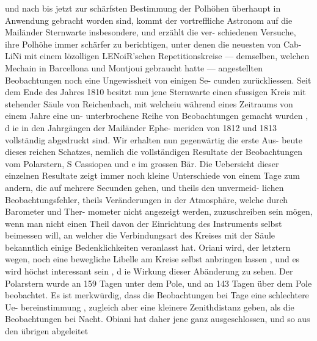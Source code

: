 \documentclass[12pt,a4paper]{article}
\begin{document}
und nach bis jetzt zur schärfsten Bestimmung der Polhöhen überhaupt in Anwendung gebracht worden\newline
sind, kommt der vortreffliche Astronom auf die Mailänder Sternwarte insbesondere, und erzählt die ver-\newline
schiedenen Versuche, ihre Polhöhe immer schärfer zu berichtigen, unter denen die neuesten von Cab-\newline
LiNi mit einem lözolligen LENoiR'schen Repetitionskreise --- demselben, welchen Mechain in Barcellona\newline
und Montjoui gebraucht hatte --- angestellten Beobachtungen noch eine Ungewissheit von einigen Se-\newline
cunden zurückliessen. Seit dem Ende des Jahres 1810 besitzt nun jene Sternwarte einen sfussigen Kreis\newline
mit stehender Säule von Reichenbach, mit welcheiu während eines Zeitraums von einem Jahre eine un-\newline
unterbrochene Reihe von Beobachtungen gemacht wurden , d ie in den Jahrgängen der Mailänder Ephe-\newline
meriden von 1812 und 1813 vollständig abgedruckt sind. Wir erhalten nun gegenwärtig die erste Aus-\newline
beute dieses reichen Schatzes, nemlich die vollständigen Resultate der Beobachtungen vom Polarstern,\newline
S Cassiopea und e im grossen Bär. Die Uebersicht dieser einzelnen Resultate zeigt immer noch kleine\newline
Unterschiede von einem Tage zum andern, die auf mehrere Secunden gehen, und theils den unvermeid-\newline
lichen Beobachtungsfehler, theils Veränderungen in der Atmosphäre, welche durch Barometer und Ther-\newline
mometer nicht angezeigt werden, zuzuschreiben sein mögen, wenn man nicht einen Theil davon der\newline
Einrichtung des Instruments selbst beimessen will, an welcher die Verbindungsart des Kreises mit der\newline
Säule bekanntlich einige Bedenklichkeiten veranlasst hat. Oriani wird, der letztern wegen, noch eine\newline
bewegliche Libelle am Kreise selbst anbringen lassen , und es wird höchst interessant sein , d ie Wirkung\newline
dieser Abänderung zu sehen. Der Polarstern wurde an 159 Tagen unter dem Pole, und an 143 Tagen\newline
über dem Pole beobachtet. Es ist merkwürdig, dass die Beobachtungen bei Tage eine schlechtere Ue-\newline
bereinstimmung , zugleich aber eine kleinere Zenithdistanz geben, als die Beobachtungen bei Nacht.\newline
Obiani hat daher jene ganz ausgeschlossen, und so aus den übrigen abgeleitet\newline
\end{document}

